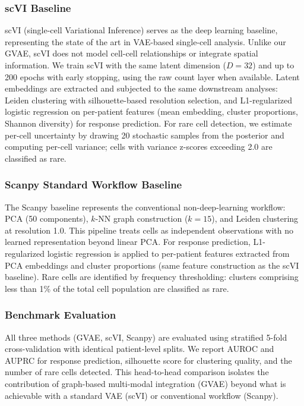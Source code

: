 \documentclass{article}
\begin{document}
\subsubsection{scVI Baseline}

scVI (single-cell Variational Inference) \citep{lopez2018deep} serves as the deep learning baseline, representing the state of the art in VAE-based single-cell analysis. Unlike our GVAE, scVI does not model cell-cell relationships or integrate spatial information. We train scVI with the same latent dimension ($D = 32$) and up to 200 epochs with early stopping, using the raw count layer when available. Latent embeddings are extracted and subjected to the same downstream analyses: Leiden clustering with silhouette-based resolution selection, and L1-regularized logistic regression on per-patient features (mean embedding, cluster proportions, Shannon diversity) for response prediction. For rare cell detection, we estimate per-cell uncertainty by drawing 20 stochastic samples from the posterior and computing per-cell variance; cells with variance z-scores exceeding 2.0 are classified as rare.

\subsubsection{Scanpy Standard Workflow Baseline}

The Scanpy baseline represents the conventional non-deep-learning workflow: PCA (50 components), $k$-NN graph construction ($k = 15$), and Leiden clustering at resolution 1.0. This pipeline treats cells as independent observations with no learned representation beyond linear PCA. For response prediction, L1-regularized logistic regression is applied to per-patient features extracted from PCA embeddings and cluster proportions (same feature construction as the scVI baseline). Rare cells are identified by frequency thresholding: clusters comprising less than 1\% of the total cell population are classified as rare.

\subsubsection{Benchmark Evaluation}

All three methods (GVAE, scVI, Scanpy) are evaluated using stratified 5-fold cross-validation with identical patient-level splits. We report AUROC and AUPRC for response prediction, silhouette score for clustering quality, and the number of rare cells detected. This head-to-head comparison isolates the contribution of graph-based multi-modal integration (GVAE) beyond what is achievable with a standard VAE (scVI) or conventional workflow (Scanpy).
\end{document}
